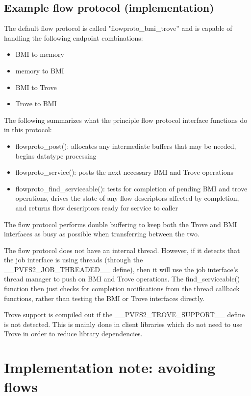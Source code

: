 \documentclass[12pt]{article} %
\begin{document}
\subsection{Example flow protocol (implementation)}

The default flow protocol is called "flowproto\_bmi\_trove'' and is capable of
handling the following endpoint combinations:

\begin{itemize}
\item BMI to memory 
\item memory to BMI
\item BMI to Trove
\item Trove to BMI
\end{itemize}

The following summarizes what the principle flow protocol interface functions
do in this protocol:

\begin{itemize}
\item flowproto\_post(): allocates any intermediate buffers that may be needed,
begins datatype processing
\item flowproto\_service(): posts the next necessary BMI and Trove operations
\item flowproto\_find\_serviceable(): tests for completion of pending BMI and 
trove operations, drives the state of any flow descriptors affected by completion, and returns flow descriptors ready for service to caller
\end{itemize}

The flow protocol performs double buffering to keep both the Trove and BMI interfaces as busy as possible when transferring between the two.

The flow protocol does not have an internal thread.  However, if it detects that the job interface is using threads (through the \_\_PVFS2\_JOB\_THREADED\_\_ define), then it will use the job interface's thread manager to push on BMI and 
Trove operations.  The find\_serviceable() function then just checks for
completion notifications from the thread callback functions, rather than
testing the BMI or Trove interfaces directly.

Trove support is compiled out if the \_\_PVFS2\_TROVE\_SUPPORT\_\_ define is
not detected.  This is mainly done in client libraries which do not 
need to use Trove in order to reduce library dependencies.

\section{Implementation note: avoiding flows}
\end{document}
